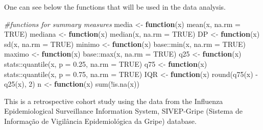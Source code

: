 \documentclass[
]{article}
\newenvironment{Shaded}{\begin{snugshade}}{\end{snugshade}}
\newcommand{\AttributeTok}[1]{\textcolor[rgb]{0.77,0.63,0.00}{#1}}
\newcommand{\CommentTok}[1]{\textcolor[rgb]{0.56,0.35,0.01}{\textit{#1}}}
\newcommand{\ConstantTok}[1]{\textcolor[rgb]{0.00,0.00,0.00}{#1}}
\newcommand{\ControlFlowTok}[1]{\textcolor[rgb]{0.13,0.29,0.53}{\textbf{#1}}}
\newcommand{\DecValTok}[1]{\textcolor[rgb]{0.00,0.00,0.81}{#1}}
\newcommand{\FloatTok}[1]{\textcolor[rgb]{0.00,0.00,0.81}{#1}}
\newcommand{\FunctionTok}[1]{\textcolor[rgb]{0.00,0.00,0.00}{#1}}
\newcommand{\NormalTok}[1]{#1}
\newcommand{\OtherTok}[1]{\textcolor[rgb]{0.56,0.35,0.01}{#1}}
\newcommand{\SpecialCharTok}[1]{\textcolor[rgb]{0.00,0.00,0.00}{#1}}
\begin{document}
One can see below the functions that will be used in the data analysis.

\begin{Shaded}
\begin{Highlighting}[]
\CommentTok{\#functions for summary measures}
\NormalTok{media }\OtherTok{\textless{}{-}} \ControlFlowTok{function}\NormalTok{(x)}
  \FunctionTok{mean}\NormalTok{(x, }\AttributeTok{na.rm =} \ConstantTok{TRUE}\NormalTok{)}
\NormalTok{mediana }\OtherTok{\textless{}{-}} \ControlFlowTok{function}\NormalTok{(x)}
  \FunctionTok{median}\NormalTok{(x, }\AttributeTok{na.rm =} \ConstantTok{TRUE}\NormalTok{)}
\NormalTok{DP }\OtherTok{\textless{}{-}} \ControlFlowTok{function}\NormalTok{(x)}
  \FunctionTok{sd}\NormalTok{(x, }\AttributeTok{na.rm =} \ConstantTok{TRUE}\NormalTok{)}
\NormalTok{minimo }\OtherTok{\textless{}{-}} \ControlFlowTok{function}\NormalTok{(x)}
\NormalTok{  base}\SpecialCharTok{::}\FunctionTok{min}\NormalTok{(x, }\AttributeTok{na.rm =} \ConstantTok{TRUE}\NormalTok{)}
\NormalTok{maximo }\OtherTok{\textless{}{-}} \ControlFlowTok{function}\NormalTok{(x)}
\NormalTok{  base}\SpecialCharTok{::}\FunctionTok{max}\NormalTok{(x, }\AttributeTok{na.rm =} \ConstantTok{TRUE}\NormalTok{)}
\NormalTok{q25 }\OtherTok{\textless{}{-}} \ControlFlowTok{function}\NormalTok{(x)}
\NormalTok{  stats}\SpecialCharTok{::}\FunctionTok{quantile}\NormalTok{(x, }\AttributeTok{p =} \FloatTok{0.25}\NormalTok{, }\AttributeTok{na.rm =} \ConstantTok{TRUE}\NormalTok{)}
\NormalTok{q75 }\OtherTok{\textless{}{-}} \ControlFlowTok{function}\NormalTok{(x)}
\NormalTok{  stats}\SpecialCharTok{::}\FunctionTok{quantile}\NormalTok{(x, }\AttributeTok{p =} \FloatTok{0.75}\NormalTok{, }\AttributeTok{na.rm =} \ConstantTok{TRUE}\NormalTok{)}
\NormalTok{IQR }\OtherTok{\textless{}{-}} \ControlFlowTok{function}\NormalTok{(x)}
  \FunctionTok{round}\NormalTok{(}\FunctionTok{q75}\NormalTok{(x) }\SpecialCharTok{{-}} \FunctionTok{q25}\NormalTok{(x), }\DecValTok{2}\NormalTok{)}
\NormalTok{n }\OtherTok{\textless{}{-}} \ControlFlowTok{function}\NormalTok{(x)}
  \FunctionTok{sum}\NormalTok{(}\SpecialCharTok{!}\FunctionTok{is.na}\NormalTok{(x))}
\end{Highlighting}
\end{Shaded}

This is a retrospective cohort study using the data from the Influenza
Epidemiological Surveillance Information System, SIVEP-Gripe (Sistema de
Informação de Vigilância Epidemiológica da Gripe) database.
\end{document}
